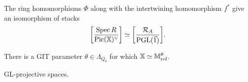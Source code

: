 \documentclass[12pt]{amsart}
\begin{document}
\begin{corollary}
The ring homomorphisms $\Phi$ along with the intertwining homomorphism $f^*$ give an isomorphism of stacks $$\bigg[\frac{\operatorname{Spec} R}{\operatorname{Pic}(\mathbb{X})^\vee}\bigg] \simeq \bigg[\frac{\mathcal{R}_A}{\operatorname{PGL}(\vec{1})}\bigg].$$
\end{corollary}

\begin{corollary}
There is a GIT parameter $\theta \in \Lambda_{Q_0}$ for which $\mathbb{X} \simeq \mathbb{M}_\textup{ref}^\theta$.
\end{corollary}

\begin{example}
GL-projective spaces.
\end{example}







\end{document}
